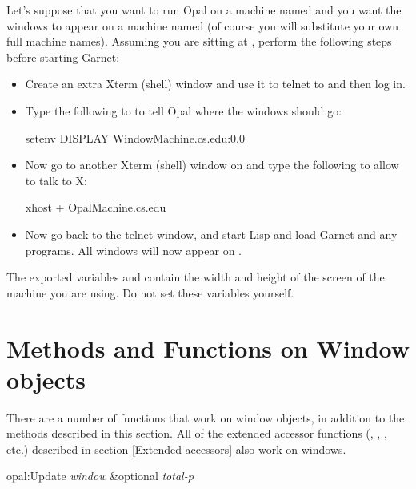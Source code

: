 Let's suppose that you want to run Opal on a machine named
 and you want the windows to appear on a machine
named  (of course you will substitute your own
full machine names).  Assuming you are sitting at
, perform the following steps before starting Garnet:

\begin{itemize}
\item Create an extra Xterm (shell) window and use it to telnet to
 and then log in.

\item 
Type the following to  to tell Opal where the
windows should go:
\begin{programexample}
setenv DISPLAY WindowMachine.cs.edu:0.0
\end{programexample}


\item 
Now go to another Xterm (shell) window on 
and type the following to allow  to talk to X:
\begin{programexample}
xhost + OpalMachine.cs.edu
\end{programexample}


\item Now go back to the telnet window, and start Lisp and load Garnet and any
programs.  All windows will now appear on .
\end{itemize}

 
The exported variables  and 
contain the width and height of the screen of the machine you are using.  Do
not set these variables yourself.

\section{Methods and Functions on Window objects}
\label{windowfuncs}

There are a number of functions that work on window objects, in addition to
the methods described in this section.  All of the extended accessor
functions (, , , etc.) described in
section \ref{Extended-accessors} also work on windows.


\begin{programexample}
opal:Update {\it window} \&optional {\it total-p}\value{method}
\end{programexample}

